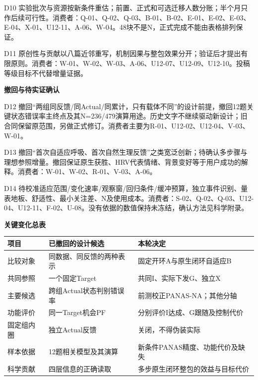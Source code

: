 \documentclass[11pt,a4paper]{article}
\newcommand{\reviewsubsection}[1]{\par\Needspace{4\baselineskip}\vspace{4pt}\begin{center}{\titlelatin\titlecjk\bfseries\fontsize{12}{18}\selectfont #1}\end{center}}
\begin{document}
D10 实验批次与资源按新条件重估；前置、正式和可选迁移人数分账；半个月只作后续可行性。消费者：Q-\allowbreak{}01、Q-\allowbreak{}02、Q-\allowbreak{}03、B-\allowbreak{}01、B-\allowbreak{}02、E-\allowbreak{}01、E-\allowbreak{}02、E-\allowbreak{}03、E-\allowbreak{}04、X-\allowbreak{}01、U12-\allowbreak{}11、A-\allowbreak{}06、W-\allowbreak{}04。48块不是N，正式完成不能由表格排列保证。


D11 原创性与贡献以八篇近邻重写，机制因果与整包效果分开；验证后才提出有限原则。消费者：W-\allowbreak{}01、W-\allowbreak{}02、W-\allowbreak{}03、A-\allowbreak{}06、U12-\allowbreak{}07、U12-\allowbreak{}09、U12-\allowbreak{}10。投稿等级目标不代替增量证据。


\reviewsubsection{3.3 撤回与待实证确认}
D12 撤回“两组同反馈/\allowbreak{}同Actual/\allowbreak{}同累计，只有载体不同”的设计前提，撤回12题关键状态错误率主终点及其N=236/\allowbreak{}479演算用途。历史文字不继续驱动新设计；旧合同保留原范围，另做正式修订。消费者主要为R-\allowbreak{}01、U12-\allowbreak{}02、U12-\allowbreak{}04、V-\allowbreak{}03、W-\allowbreak{}01。


D13 撤回“首次自适应呼吸、首次自然生理反馈”之类宽泛创新；待确认多步骤与理想参照增量。撤回保证原生获胜、HRV代表情绪、背景变好等于用户成功的解释。消费者：W-\allowbreak{}01、W-\allowbreak{}02、R-\allowbreak{}01、V-\allowbreak{}03、A-\allowbreak{}06。


D14 待校准适应范围/\allowbreak{}变化速率/\allowbreak{}观察窗/\allowbreak{}回归条件/\allowbreak{}缓冲预算，独立事件识别、量表地板、舒适性、最小关注差、N及使用成本。消费者：S-\allowbreak{}02、Q-\allowbreak{}02、Q-\allowbreak{}03、U12-\allowbreak{}04、U12-\allowbreak{}11、F-\allowbreak{}02、U-\allowbreak{}08。没有依据的数值保持未冻结，确认方法见科学附录。


\reviewsubsection{3.4 关键变化总表}
\small\begin{longtable}{|p{.18\linewidth}|p{.32\linewidth}|p{.36\linewidth}|}
\hline 项目 & 已撤回的设计候选 & 本轮决定 \\ \hline\endhead
比较对象 & 同数据、同反馈的两种表示 & 固定开环A与原生闭环自适应B \\ \hline
共同参照 & 一个固定Target & 共同I、实际下发G、独立X \\ \hline
主要候选 & 跨组Actual状态判别错误率 & 前测校正PANAS-\allowbreak{}NA；其他分轴 \\ \hline
功能评价 & 同一Target机会PF & 分别评价I达成、G跟随及控制代价 \\ \hline
固定组内圈 & 独立Actual反馈 & 关闭，不得伪装实际 \\ \hline
样本依据 & 12题相关模型及其演算 & 新条件PANAS精度、功能代价及缺失 \\ \hline
科学贡献 & 四层信息的正确读取 & 多步原生闭环整包的效益与目标代价 \\ \hline
\end{longtable}\normalsize
\end{document}
